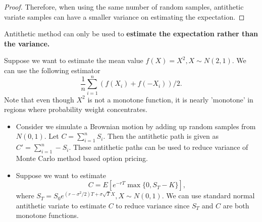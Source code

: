 \begin{refsection}
\begin{proof}
	Therefore, when using the same number of random samples, antithetic variate samples can have a smaller variance on estimating the expectation.	
\end{proof}


\begin{remark}[caution!]
	Antithetic method can only be used to \textbf{estimate the expectation rather than the variance.}
\end{remark}

\begin{example}
	Suppose we want to estimate the mean value $f(X) = X^2, X\sim N(2,1)$. We can use the following estimator
	$$\frac{1}{n}\sum_{i=1}^n(f(X_i) + f(-X_i))/2.$$ 
	Note that even though $X^2$ is not a monotone function, it is nearly 'monotone' in regions where probability weight concentrates. 
\end{example}



\begin{example}\hfill
	\begin{itemize}
		\item Consider we simulate a Brownian motion by adding up random samples from $N(0,1)$. Let $C=\sum_{i=1}^n S_i$. Then the antithetic path is given as $C'=\sum_{i=1}^n -S_i$. These antithetic paths can be used to reduce variance of Monte Carlo method based option pricing.  
		\item Suppose we want to estimate $$C = E[e^{-rT}\max\{0,S_T-K\}],$$
		where $S_T = S_0e^{(r-\sigma^2/2)T+\sigma\sqrt{T}X},X\sim N(0,1)$. We can use standard normal antithetic variate to estimate $C$ to reduce variance since $S_T$ and $C$ are both monotone functions. 
	\end{itemize}
\end{example}


\end{refsection}
